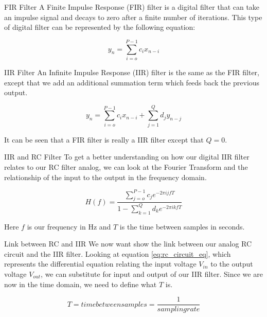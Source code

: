 \documentclass{beamer}
\begin{document}
\begin{frame}
\begin{block}{FIR Filter}
A Finite Impulse Response (FIR) filter is a digital filter that can take an impulse signal and decays to zero after a finite number of iterations.  This type of digital filter can be represented by the following equation:

\begin{equation}\label{IIR_yn}
y_n=\displaystyle\sum\limits_{i=o}^{P-1} c_ix_{n-i}
\end{equation}
\end{block}
\end{frame}

\begin{frame}
\begin{block}{IIR Filter}
An Infinite Impulse Response (IIR) filter is the same as the FIR filter, except that we add an additional summation term which feeds back the previous output.

\begin{equation}\label{IIR_sum}
y_n=\displaystyle\sum\limits_{i=o}^{P-1} c_ix_{n-i}+\displaystyle\sum\limits_{j=1}^{Q} d_jy_{n-j}
\end{equation}

It can be seen that a FIR filter is really a IIR filter except that $Q=0$.  
\end{block}
\end{frame}

\begin{frame}
\begin{block}{IIR and RC Filter}
To get a better understanding on how our digital IIR filter relates to our RC filter analog, we can look at the Fourier Transform and the relationship of the input to the output in the frequency domain.

\begin{equation}\label{Fourier}
H(f)=\frac{\displaystyle\sum\limits_{j=o}^{P-1} c_je^{-2\pi ijfT}}{1-\displaystyle\sum\limits_{k=1}^{Q} d_ke^{-2\pi ikfT}}
\end{equation}

Here $f$ is our frequency in Hz and $T$ is the time between samples in seconds.
\end{block}
\end{frame}

\begin{frame}
\begin{block}{Link between RC and IIR}
We now want show the link between our analog RC circuit and the IIR filter.  Looking at equation \ref{eq:rc_circuit_eq}, which represents the differential equation relating the input voltage $V_{in}$ to the output voltage $V_{out}$, we can substitute for input and output of our IIR filter.  Since we are now in the time domain, we need to define what $T$ is.

\begin{equation}\label{Sample}
T=time between samples=\frac{1}{sampling rate}
\end{equation}
\end{block}
\end{frame}
\end{document}
